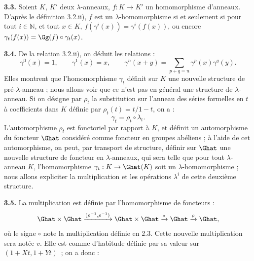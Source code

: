 \textbf{3.3.}
Soient \(K\), \(K'\) deux \(\lambda\)-anneaux, \(f:K\to K'\) un homomorphisme d'anneaux. D'après le définition 3.2.ii), \(f\) est un \(\lambda\)-homomorphisme si et seulement si pour tout \(i\in\mathbb N\), et tout \(x\in K\), \(f(\gamma^i(x))=\gamma^i(f(x))\), ou encore \(\gamma_t(f(x))=\Gg(f)\circ\gamma_t(x)\).

\textbf{3.4.} De la relation 3.2.ii), on déduit les relations :
\begin{equation}\tag{3.4.1}
  \gamma^0(x)=1,
  \qquad \gamma^1(x)=x,
  \qquad \gamma^n(x+y)=\sum_{p+q=n}\gamma^p(x)\gamma^q(y).
\end{equation}
Elles montrent que l'homomorphisme \(\gamma_t\) définit sur \(K\) une nouvelle structure de pré-\(\lambda\)-anneau ; nous allons voir que ce n'est pas en général une structure de \(\lambda\)-anneau. Si on désigne par \(\rho_t\) la substitution sur l'anneau des séries formelles en \(t\) à coefficients dans \(K\) définie par \(\rho_t(t)=t/1-t\), on a :
\[
  \gamma_t=\rho_t\circ\lambda_t.
\]
L'automorphisme \(\rho_t\) est fonctoriel par rapport à \(K\), et définit un automorphisme du foncteur \(\Ghat\) considéré comme foncteur en groupes abéliens ; à l'aide de cet automorphisme, on peut, par transport de structure, définir sur \(\Ghat\) une nouvelle structure de foncteur en \(\lambda\)-anneaux, qui sera telle que pour tout \(\lambda\)-anneau \(K\), l'homomorphisme \(\gamma_t:K\to\Ghat(K)\) soit un \(\lambda\)-homomorphisme ; nous allons expliciter la multiplication et les opérations \(\lambda^i\) de cette deuxième structure.

\textbf{3.5.} La multiplication est définie par l'homomorphisme de foncteurs :
\[
  \Ghat\times\Ghat\xrightarrow{(\rho^{-1},\rho^{-1})}
  \Ghat\times\Ghat\xrightarrow{\circ}\Ghat\xrightarrow{\rho}\Ghat ,
\]
où le signe \(\circ\) note la multiplication définie en 2.3. Cette nouvelle multiplication sera notée \(v\). Elle est comme d'habitude définie par sa valeur sur \((1+Xt,1+Yt)\)~; on a donc :
